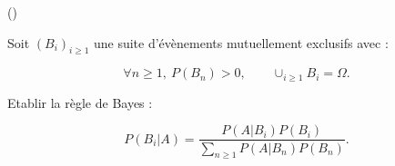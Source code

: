 \begin{exercice}\label{exo3-9} (\minsyndical)

Soit $(B_i)_{i \geq 1}$ une suite d'\'ev\`enements mutuellement exclusifs avec :

\[ \forall n \geq 1,\: P(B_n)>0,\qquad \cup_{i\geq 1} B_i = \Omega.\]

Etablir la r\`egle de Bayes :

\[
P(B_i | A ) = \frac{P(A | B_i)P(B_i)}{\sum_{n \geq 1} P(A | B_n)P(B_n)}.
\]


\end{exercice}
